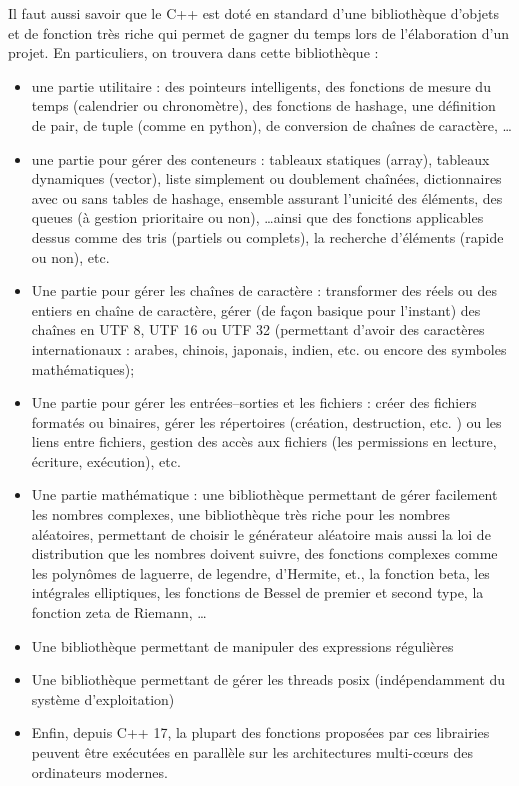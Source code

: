 Il faut aussi savoir que le C++ est doté en standard d'une bibliothèque d'objets et de fonction très riche qui permet de gagner du temps lors de l'élaboration d'un projet. En particuliers, on trouvera dans cette bibliothèque :
\begin{itemize}
    \item une partie utilitaire : des pointeurs intelligents, des fonctions de mesure du temps (calendrier ou chronomètre), des fonctions de hashage, une définition de pair, de tuple (comme en python), de conversion de chaînes de caractère, \ldots
    \item une partie pour gérer des conteneurs : tableaux statiques (array), tableaux dynamiques (vector), liste simplement ou doublement chaînées, dictionnaires avec ou sans tables de hashage, ensemble assurant l'unicité des éléments, des queues
    (à gestion prioritaire ou non), \ldots ainsi que des fonctions applicables dessus comme des tris (partiels ou complets),
    la recherche d'éléments (rapide ou non), etc.
    \item Une partie pour gérer les chaînes de caractère : transformer des réels ou des entiers en chaîne de caractère, gérer (de façon basique pour l'instant) des chaînes en UTF 8, UTF 16 ou UTF 32 (permettant d'avoir des caractères internationaux : arabes, chinois, japonais, indien, etc. ou encore des symboles mathématiques);
    \item Une partie pour gérer les entrées--sorties et les fichiers : créer des fichiers formatés ou binaires, gérer les répertoires (création, destruction, etc. ) ou les liens entre fichiers, gestion des accès aux fichiers (les permissions
    en lecture, écriture, exécution), etc.
    \item Une partie mathématique : une bibliothèque permettant de gérer facilement les nombres complexes, une bibliothèque très riche pour les nombres aléatoires, permettant de choisir le générateur aléatoire mais aussi la loi de distribution
    que les nombres doivent suivre, des fonctions complexes comme les polynômes de laguerre, de legendre, d'Hermite, et., la fonction beta, les intégrales elliptiques, les fonctions de Bessel de premier et second type, la fonction zeta de Riemann,
    \ldots
    \item Une bibliothèque permettant de manipuler des expressions régulières
    \item Une bibliothèque permettant de gérer les threads posix (indépendamment du système d'exploitation)
    \item Enfin, depuis C++ 17, la plupart des fonctions proposées par ces librairies peuvent être exécutées en parallèle
    sur les architectures multi-c{\oe}urs des ordinateurs modernes.
\end{itemize}

